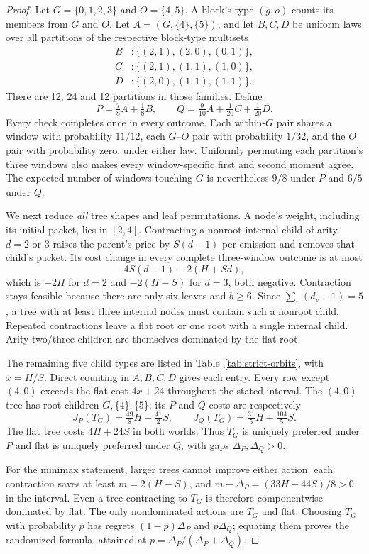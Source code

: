 \begin{proof}
Let $G=\{0,1,2,3\}$ and $O=\{4,5\}$.
A block's type $(g,o)$ counts its members from $G$ and $O$.
Let $A=(G,\{4\},\{5\})$, and let $B,C,D$ be uniform laws over all
partitions of the respective block-type multisets
\begin{align*}
 B&:\{(2,1),(2,0),(0,1)\},\\
 C&:\{(2,1),(1,1),(1,0)\},\\
 D&:\{(2,0),(1,1),(1,1)\}.
\end{align*}
There are 12, 24 and 12 partitions in those families. Define
\[
 P=\tfrac78 A+\tfrac18 B,\qquad
 Q=\tfrac9{10}A+\tfrac1{20}C+\tfrac1{20}D.
\]
Every check completes once in every outcome. Each within-$G$ pair shares
a window with probability $11/12$, each $G$--$O$ pair with probability
$1/32$, and the $O$ pair with probability zero, under either law.
Uniformly permuting each partition's three windows also makes every
window-specific first and second moment agree. The expected number of
windows touching $G$ is nevertheless $9/8$ under $P$ and $6/5$ under $Q$.

We next reduce \emph{all} tree shapes and leaf permutations.
A node's weight, including its initial packet, lies in $[2,4]$.
Contracting a nonroot internal child of arity $d=2$ or $3$ raises the
parent's price by $S(d-1)$ per emission and removes that child's packet.
Its cost change in every complete three-window outcome is at most
\[
 4S(d-1)-2(H+Sd),
\]
which is $-2H$ for $d=2$ and $-2(H-S)$ for $d=3$, both negative.
Contraction stays feasible because there are only six leaves and $b\ge6$.
Since $\sum_v(d_v-1)=5$, a tree with at least three internal nodes
must contain such a nonroot child. Repeated contractions leave a flat root
or one root with a single internal child. Arity-two/three children are
themselves dominated by the flat root.

The remaining five child types are listed in
Table~\ref{tab:strict-orbits}, with $x=H/S$.
Direct counting in $A,B,C,D$ gives each entry.
Every row except $(4,0)$ exceeds the flat cost $4x+24$ throughout
the stated interval. The $(4,0)$ tree has root children $G,\{4\},\{5\}$;
its $P$ and $Q$ costs are respectively
\[
 J_P(T_G)=\tfrac{49}{8}H+\tfrac{41}{2}S,\qquad
 J_Q(T_G)=\tfrac{31}{5}H+\tfrac{104}{5}S.
\]
The flat tree costs $4H+24S$ in both worlds.
Thus $T_G$ is uniquely preferred under $P$ and flat is uniquely preferred
under $Q$, with gaps $\Delta_P,\Delta_Q>0$.

For the minimax statement, larger trees cannot improve either action:
each contraction saves at least $m=2(H-S)$, and
$m-\Delta_P=(33H-44S)/8>0$ in the interval. Even a tree contracting to
$T_G$ is therefore componentwise dominated by flat. The only nondominated
actions are $T_G$ and flat. Choosing $T_G$ with probability $p$ has regrets
$(1-p)\Delta_P$ and $p\Delta_Q$; equating them proves the randomized
formula, attained at $p=\Delta_P/(\Delta_P+\Delta_Q)$.
\end{proof}


